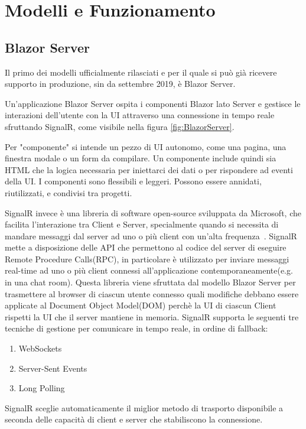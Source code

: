 \chapter{Modelli e Funzionamento}\label{cap:modefunz}
\section{Blazor Server}\label{sez:bserver}
Il primo dei modelli ufficialmente rilasciati e per il quale si pu\`o gi\`a ricevere supporto in produzione, sin da settembre 2019\cite{blazorServerRelease}, \`e Blazor Server.

Un'applicazione Blazor Server ospita i componenti Blazor lato Server e gestisce le interazioni dell'utente con la UI attraverso una connessione in tempo reale sfruttando SignalR, come visibile nella figura \ref{fig:BlazorServer}.

Per "componente" si intende un pezzo di UI autonomo, come una pagina, una finestra modale o un form da compilare.
Un componente include quindi sia HTML che la logica necessaria per iniettarci dei dati o per rispondere ad eventi della UI. 
I componenti sono flessibili e leggeri. Possono essere annidati, riutilizzati, e condivisi tra progetti\cite{whatIsAComponent}.

SignalR invece \`e una libreria di software open-source sviluppata da Microsoft, che facilita l'interazione tra Client e Server, specialmente quando si necessita di mandare messaggi dal server ad uno o pi\`u client con un'alta frequenza~\cite{signalR}.
SignalR mette a disposizione delle API che permettono al codice del server di eseguire Remote Procedure Calls(RPC), in particolare \`e utilizzato per inviare messaggi real-time ad uno o pi\`u client connessi all'applicazione contemporaneamente(e.g. in una chat room).
Questa libreria viene sfruttata dal modello Blazor Server per trasmettere al browser di ciascun utente connesso quali modifiche debbano essere applicate al Document Object Model(DOM) perch\`e la UI di ciascun Client rispetti la UI che il server mantiene in memoria.
SignalR supporta le seguenti tre tecniche di gestione per comunicare in tempo reale, in ordine di fallback:
\begin{enumerate}
	\item WebSockets
	\item Server-Sent Events
	\item Long Polling
\end{enumerate}

SignalR sceglie automaticamente il miglior metodo di trasporto disponibile a seconda delle capacit\`a di client e server che stabiliscono la connessione\cite{signalR-ASP.NET}.


